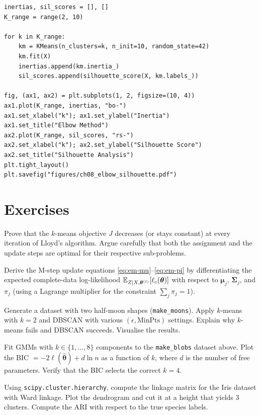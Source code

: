 \begin{codeblock}[title=\textbf{Elbow Method and Silhouette Analysis}]
\begin{verbatim}
inertias, sil_scores = [], []
K_range = range(2, 10)

for k in K_range:
    km = KMeans(n_clusters=k, n_init=10, random_state=42)
    km.fit(X)
    inertias.append(km.inertia_)
    sil_scores.append(silhouette_score(X, km.labels_))

fig, (ax1, ax2) = plt.subplots(1, 2, figsize=(10, 4))
ax1.plot(K_range, inertias, "bo-")
ax1.set_xlabel("k"); ax1.set_ylabel("Inertia")
ax1.set_title("Elbow Method")
ax2.plot(K_range, sil_scores, "rs-")
ax2.set_xlabel("k"); ax2.set_ylabel("Silhouette Score")
ax2.set_title("Silhouette Analysis")
plt.tight_layout()
plt.savefig("figures/ch08_elbow_silhouette.pdf")
\end{verbatim}
\end{codeblock}

\section{Exercises}

\begin{exercise}
Prove that the $k$-means objective $J$ decreases (or stays constant) at every iteration of Lloyd's algorithm. Argue carefully that both the assignment and the update steps are optimal for their respective sub-problems.
\end{exercise}

\begin{exercise}[EM Derivation]
Derive the M-step update equations \eqref{eq:em-mu}--\eqref{eq:em-pi} by differentiating the expected complete-data log-likelihood $\mathbb{E}_{Z\mid X,\bm{\theta}^{(t)}}[\ell_c(\bm{\theta})]$ with respect to $\bm{\mu}_j$, $\bm{\Sigma}_j$, and $\pi_j$ (using a Lagrange multiplier for the constraint $\sum_j\pi_j=1$).
\end{exercise}

\begin{exercise}
Generate a dataset with two half-moon shapes (\texttt{make\_moons}). Apply $k$-means with $k=2$ and DBSCAN with various $(\epsilon,\text{MinPts})$ settings. Explain why $k$-means fails and DBSCAN succeeds. Visualise the results.
\end{exercise}

\begin{exercise}
Fit GMMs with $k\in\{1,\dots,8\}$ components to the \texttt{make\_blobs} dataset above. Plot the BIC $= -2\ell(\hat{\bm{\theta}}) + d\ln n$ as a function of $k$, where $d$ is the number of free parameters. Verify that the BIC selects the correct $k=4$.
\end{exercise}

\begin{exercise}
Using \texttt{scipy.cluster.hierarchy}, compute the linkage matrix for the Iris dataset with Ward linkage. Plot the dendrogram and cut it at a height that yields 3 clusters. Compute the ARI with respect to the true species labels.
\end{exercise}
